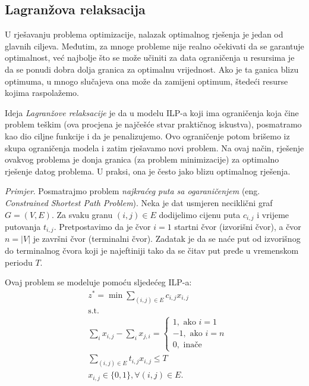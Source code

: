 \documentclass[a4paper, utf8, 11pt, colorlinks]{article}
\begin{document}
\subsection{Lagranžova relaksacija}
U rješavanju problema optimizacije, nalazak optimalnog rješenja je jedan od glavnih ciljeva. Međutim, za mnoge probleme nije realno očekivati da se garantuje optimalnost, već najbolje što se može učiniti za data ograničenja u resursima je da se ponudi dobra dolja granica za optimalnu vrijednost. Ako je ta ganica blizu optimuma, u mnogo slučajeva ona može da zamijeni optimum, štedeći resurse kojima raspolažemo. 

Ideja \emph{Lagranžove relaksacije} je da u modelu ILP-a   koji ima  ograničenja koja čine problem teškim (ova procjena je najčešće stvar praktičnog iskustva),  posmatramo kao dio ciljne funkcije i da je penalizujemo.  %
Ovo ograničenje potom brišemo iz skupa ograničenja modela i zatim rješavamo novi problem. Na ovaj način, rješenje ovakvog problema je donja granica (za problem minimizacije) za optimalno rješenje datog problema. U praksi, ona je često jako blizu optimalnog rješenja. 

\emph{Primjer}. Posmatrajmo problem \emph{najkraćeg puta sa ogaraničenjem} (eng. \emph{Constrained Shortest Path Problem}). Neka je dat usmjeren neciklični graf $G=(V,E)$. Za svaku granu $(i,j) \in E$ dodijelimo cijenu puta $c_{i,j}$ i vrijeme putovanja $t_{i,j}$. Pretpostavimo da je čvor $i=1$ startni čvor (izvorišni čvor), a čvor $n = |V|$ je završni čvor (terminalni čvor). Zadatak je da se naće put  od izvorišnog do terminalnog čvora koji je najeftiniji tako da se čitav put pređe u vremenskom periodu $T$.

Ovaj problem se modeluje pomoću sljedećeg ILP-a:
 \begin{align}
    &z^*=\min\sum_{(i,j) \in E }c_{i,j}x_{i,j} \\
    &\mbox{s.t. }\\
    & \sum_{i} x_{i,j} - \sum_{i} x_{j,i} = \begin{cases}  
                                               1, \mbox{ ako } i=1 \\
                                              -1, \mbox{ ako } i=n \\
                                               0, \mbox{ inače }
                                            \end{cases} \\
    & \sum_{(i,j) \in E} t_{i,j} x_{i,j} \leq T \\
    & x_{i,j} \in \{0, 1 \}, \forall (i,j) \in E.
\end{align} 
\end{document}
